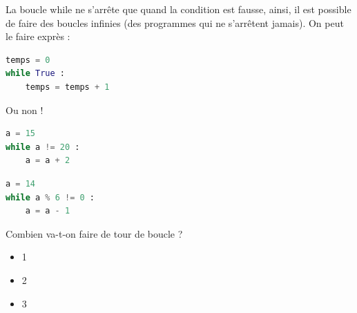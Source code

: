 \begin{Comprendre}
La boucle while ne s'arrête que quand la condition est fausse, ainsi, il est possible de faire des boucles infinies (des programmes qui ne s'arrêtent jamais).
On peut le faire exprès :
\begin{lstlisting}[style=pythonstyle, language=python]
temps = 0
while True :
    temps = temps + 1
\end{lstlisting}
Ou non !
\begin{lstlisting}[style=pythonstyle, language=python]
a = 15
while a != 20 :
    a = a + 2
\end{lstlisting}
\end{Comprendre}

\begin{Quizz}
\begin{lstlisting}[style=pythonstyle, language=python]
a = 14
while a % 6 != 0 :
    a = a - 1
\end{lstlisting}

Combien va-t-on faire de tour de boucle ?
\begin{itemize}
    \renewcommand{\labelitemi}{$\square$}
    \item 1
    \item 2
    \item 3
\end{itemize}
\end{Quizz}

